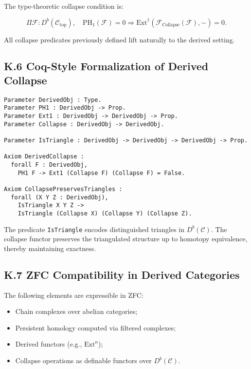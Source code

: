\documentclass[11pt]{article}
\begin{document}
The type-theoretic collapse condition is:

\[
\Pi \mathcal{F} : D^b(\mathcal{C}_{\mathrm{top}}), \quad \mathrm{PH}_1(\mathcal{F}) = 0 \Rightarrow \mathrm{Ext}^1(\mathcal{F}_{\mathrm{Collapse}}(\mathcal{F}), -) = 0.
\]

All collapse predicates previously defined lift naturally to the derived setting.

\subsection*{K.6 Coq-Style Formalization of Derived Collapse}

\begin{lstlisting}[language=Coq]
Parameter DerivedObj : Type.
Parameter PH1 : DerivedObj -> Prop.
Parameter Ext1 : DerivedObj -> DerivedObj -> Prop.
Parameter Collapse : DerivedObj -> DerivedObj.

Parameter IsTriangle : DerivedObj -> DerivedObj -> DerivedObj -> Prop.

Axiom DerivedCollapse :
  forall F : DerivedObj,
    PH1 F -> Ext1 (Collapse F) (Collapse F) = False.

Axiom CollapsePreservesTriangles :
  forall (X Y Z : DerivedObj),
    IsTriangle X Y Z ->
    IsTriangle (Collapse X) (Collapse Y) (Collapse Z).
\end{lstlisting}

The predicate \texttt{IsTriangle} encodes distinguished triangles in \( D^b(\mathcal{C}) \). The collapse functor preserves the triangulated structure up to homotopy equivalence, thereby maintaining exactness.


\subsection*{K.7 ZFC Compatibility in Derived Categories}

The following elements are expressible in ZFC:

\begin{itemize}
    \item Chain complexes over abelian categories;
    \item Persistent homology computed via filtered complexes;
    \item Derived functors (e.g., \( \mathrm{Ext}^n \));
    \item Collapse operations as definable functors over \( D^b(\mathcal{C}) \).
\end{itemize}
\end{document}
